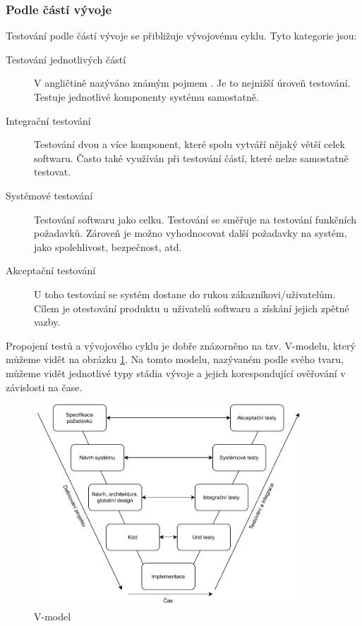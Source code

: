 \subsubsection{Podle částí vývoje}

Testování podle částí vývoje se přibližuje vývojovému cyklu. Tyto kategorie jsou:  

\begin{description}
    \item[Testování jednotlivých částí] V angličtině nazýváno známým pojmem . Je to nejnižší úroveň testování. Testuje jednotlivé komponenty systému samostatně.
    \item[Integrační testování] Testování dvou a více komponent, které spolu vytváří nějaký větší celek softwaru. Často také využíván při testování částí, které nelze samostatně testovat.
    \item[Systémové testování] Testování softwaru jako celku. Testování se směřuje na testování funkčních požadavků. Zároveň je možno vyhodnocovat další požadavky na systém, jako spolehlivost, bezpečnost, atd.
    \item[Akceptační testování] U toho testování se systém dostane do rukou zákazníkovi/uživatelům. Cílem je otestování produktu u uživatelů softwaru a získání jejich zpětné vazby. 
\end{description}

Propojení testů a vývojového cyklu je dobře znázorněno na tzv. V-modelu, který můžeme vidět na obrázku \ref{fig:vmodel}. Na tomto modelu, nazývaném podle svého tvaru, můžeme vidět jednotlivé typy stádia vývoje a jejich korespondující ověřování v závislosti na čase.

\begin{figure}[htbp]
    \centering 
    \includegraphics[width=0.9\textwidth]{assets/img/vmodel.pdf}
    \caption{V-model }
    \label{fig:vmodel}
\end{figure}


